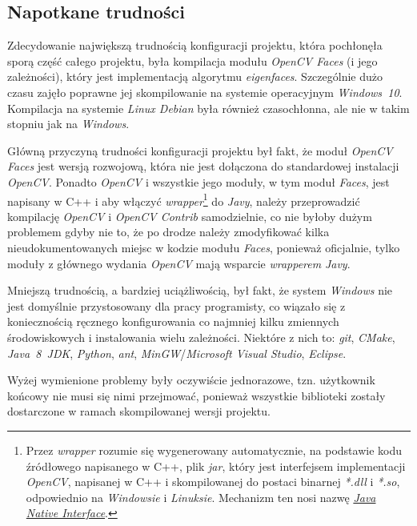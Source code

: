 \documentclass[a4paper,titlepage]{article}
\theoremstyle{break}
\numberwithin{equation}{subsection}
\begin{document}

\subsection{Napotkane trudności}

Zdecydowanie największą trudnością konfiguracji projektu, która pochłonęła sporą część całego projektu, była kompilacja modułu \emph{OpenCV Faces} (i jego zależności), który jest implementacją algorytmu \emph{eigenfaces}. Szczególnie dużo czasu zajęło poprawne jej skompilowanie na systemie operacyjnym \emph{Windows~10}. Kompilacja na systemie \emph{Linux Debian} była również czasochłonna, ale nie w takim stopniu jak na \emph{Windows}.

Główną przyczyną trudności konfiguracji projektu był fakt, że moduł \emph{OpenCV Faces} jest wersją rozwojową, która nie jest dołączona do standardowej instalacji \emph{OpenCV}. Ponadto \emph{OpenCV} i wszystkie jego moduły, w tym moduł \emph{Faces}, jest napisany w C++ i aby włączyć \emph{wrapper}\footnote{Przez \emph{wrapper} rozumie się wygenerowany automatycznie, na podstawie kodu źródłowego napisanego w C++, plik \emph{jar}, który jest interfejsem implementacji \emph{OpenCV}, napisanej w C++ i skompilowanej do postaci binarnej \emph{*.dll} i \emph{*.so}, odpowiednio na \emph{Windowsie} i \emph{Linuksie}. Mechanizm ten nosi nazwę \href{https://en.wikipedia.org/wiki/Java_Native_Interface}{\emph{Java Native Interface}}.} do \emph{Javy}, należy przeprowadzić kompilację \emph{OpenCV} i \emph{OpenCV Contrib} samodzielnie, co nie byłoby dużym problemem gdyby nie to, że po drodze należy zmodyfikować kilka nieudokumentowanych miejsc w kodzie modułu \emph{Faces}, ponieważ oficjalnie, tylko moduły z głównego wydania \emph{OpenCV} mają wsparcie \emph{wrapperem} \emph{Javy}.

Mniejszą trudnością, a bardziej uciążliwością, był fakt, że system \emph{Windows} nie jest domyślnie przystosowany dla pracy programisty, co wiązało się z koniecznością ręcznego konfigurowania co najmniej kilku zmiennych środowiskowych i instalowania wielu zależności. Niektóre z nich to: \emph{git}, \emph{CMake}, \emph{Java~8~JDK}, \emph{Python}, \emph{ant}, \emph{MinGW}/\emph{Microsoft Visual Studio}, \emph{Eclipse}.

Wyżej wymienione problemy były oczywiście jednorazowe, tzn. użytkownik końcowy nie musi się nimi przejmować, ponieważ wszystkie biblioteki zostały dostarczone w ramach skompilowanej wersji projektu.
\end{document}
